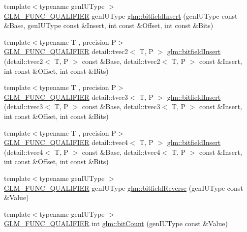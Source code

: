 \begin{DoxyCompactItemize}
\item 
{\footnotesize template$<$typename gen\+I\+U\+Type $>$ }\\\hyperlink{setup_8hpp_a33fdea6f91c5f834105f7415e2a64407}{G\+L\+M\+\_\+\+F\+U\+N\+C\+\_\+\+Q\+U\+A\+L\+I\+F\+I\+ER} gen\+I\+U\+Type \hyperlink{group__core__func__integer_ga7ab09972d52094d97d2480982e657dd0}{glm\+::bitfield\+Insert} (gen\+I\+U\+Type const \&Base, gen\+I\+U\+Type const \&Insert, int const \&Offset, int const \&Bits)
\item 
{\footnotesize template$<$typename T , precision P$>$ }\\\hyperlink{setup_8hpp_a33fdea6f91c5f834105f7415e2a64407}{G\+L\+M\+\_\+\+F\+U\+N\+C\+\_\+\+Q\+U\+A\+L\+I\+F\+I\+ER} detail\+::tvec2$<$ T, P $>$ \hyperlink{namespaceglm_a3fe5875041ab0644094ed8866cfbf414}{glm\+::bitfield\+Insert} (detail\+::tvec2$<$ T, P $>$ const \&Base, detail\+::tvec2$<$ T, P $>$ const \&Insert, int const \&Offset, int const \&Bits)
\item 
{\footnotesize template$<$typename T , precision P$>$ }\\\hyperlink{setup_8hpp_a33fdea6f91c5f834105f7415e2a64407}{G\+L\+M\+\_\+\+F\+U\+N\+C\+\_\+\+Q\+U\+A\+L\+I\+F\+I\+ER} detail\+::tvec3$<$ T, P $>$ \hyperlink{namespaceglm_ac119fb710c26ac07213e39e16ce02b39}{glm\+::bitfield\+Insert} (detail\+::tvec3$<$ T, P $>$ const \&Base, detail\+::tvec3$<$ T, P $>$ const \&Insert, int const \&Offset, int const \&Bits)
\item 
{\footnotesize template$<$typename T , precision P$>$ }\\\hyperlink{setup_8hpp_a33fdea6f91c5f834105f7415e2a64407}{G\+L\+M\+\_\+\+F\+U\+N\+C\+\_\+\+Q\+U\+A\+L\+I\+F\+I\+ER} detail\+::tvec4$<$ T, P $>$ \hyperlink{namespaceglm_ad9cf2cd98236c704a80098f2bc801fcf}{glm\+::bitfield\+Insert} (detail\+::tvec4$<$ T, P $>$ const \&Base, detail\+::tvec4$<$ T, P $>$ const \&Insert, int const \&Offset, int const \&Bits)
\item 
{\footnotesize template$<$typename gen\+I\+U\+Type $>$ }\\\hyperlink{setup_8hpp_a33fdea6f91c5f834105f7415e2a64407}{G\+L\+M\+\_\+\+F\+U\+N\+C\+\_\+\+Q\+U\+A\+L\+I\+F\+I\+ER} gen\+I\+U\+Type \hyperlink{group__core__func__integer_gac28880e609c6eeb0a28f1a54b1edc715}{glm\+::bitfield\+Reverse} (gen\+I\+U\+Type const \&Value)
\item 
{\footnotesize template$<$typename gen\+I\+U\+Type $>$ }\\\hyperlink{setup_8hpp_a33fdea6f91c5f834105f7415e2a64407}{G\+L\+M\+\_\+\+F\+U\+N\+C\+\_\+\+Q\+U\+A\+L\+I\+F\+I\+ER} int \hyperlink{namespaceglm_a3327aadbf9816a3f8b182cbd9bcb1aac}{glm\+::bit\+Count} (gen\+I\+U\+Type const \&Value)

\end{DoxyCompactItemize}
